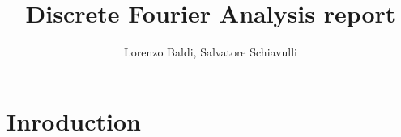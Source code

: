 \documentclass[a4paper,11pt]{article}
\theoremstyle{plain}
\theoremstyle{definition}
\theoremstyle{remark}
\begin{document}
\author{Lorenzo Baldi, Salvatore Schiavulli}
\title{Discrete Fourier Analysis report}
\maketitle
\newpage
\tableofcontents

\section{Inroduction}






\printbibliography
\end{document}
